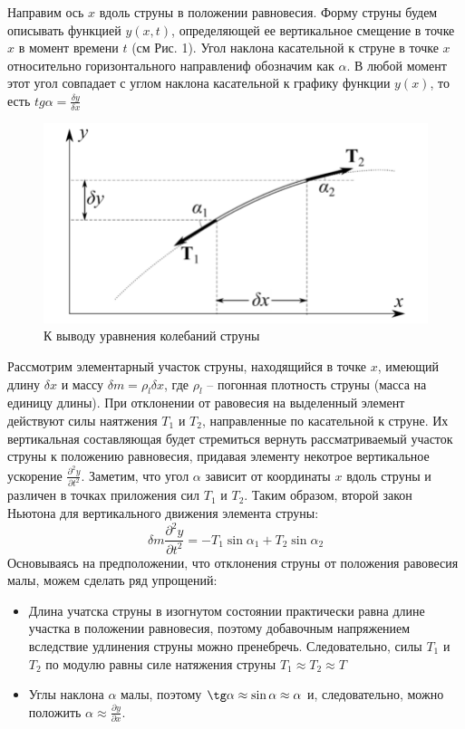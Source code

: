 \documentclass[a4paper,12pt]{article} %
\begin{document}
Направим ось $x$ вдоль струны в положении равновесия. Форму струны будем описывать функцией $y(x, t)$, определяющей ее вертикальное смещение в точке $x$ в момент времени $t$ (см Рис. 1). Угол наклона касательной к струне в точке $x$ относительно горизонтального направлениф обозначим как $\alpha$. В любой момент этот угол совпадает с углом наклона касательной к графику функции $y(x)$, то есть $tg\alpha = \frac{\delta y}{\delta x}$
\begin{figure}[h]
\centering
\includegraphics[scale=0.5]{5}
\caption{К выводу уравнения колебаний струны}
\end{figure}
Рассмотрим элементарный участок струны, находящийся в точке $x$, имеющий длину $\delta x$ и массу $\delta m = \rho_l\delta x$, где $\rho_l$ -- погонная плотность струны (масса на единицу длины). При отклонении от равовесия на выделенный элемент действуют силы наятжения $T_1$ и $T_2$, направленные по касательной к струне. Их вертикальная составляющая будет стремиться вернуть рассматриваемый участок струны к положению равновесия, придавая элементу некотрое вертикальное ускорение $\frac{\partial^2y}{\partial t^2}$. Заметим, что угол $\alpha$ зависит от координаты $x$ вдоль струны и различен в точках приложения сил $T_1$ и $T_2$. Таким образом, второй закон Ньютона для вертикального движения элемента струны:
\begin{equation}
\delta m \frac{\partial^2 y}{\partial t^2} = -T_1\sin\alpha_1 + T_2\sin\alpha_2
\end{equation}
Основываясь на предположении, что отклонения струны от положения равовесия малы, можем сделать ряд упрощений:
\begin{itemize}
\item Длина учатска струны в изогнутом состоянии практически равна длине участка в положении равновесия, поэтому добавочным напряжением вследствие удлинения струны можно пренебречь. Следовательно, силы $T_1$ и $T_2$ по модулю равны силе натяжения струны $T_1 \approx T_2 \approx T$
\item Углы наклона $\alpha$ малы, поэтому $\tg\alpha\approx\sin\alpha\approx\alpha$ и, следовательно, можно положить $\alpha \approx\frac{\partial y}{\partial x}$.
\end{itemize}
\end{document}
